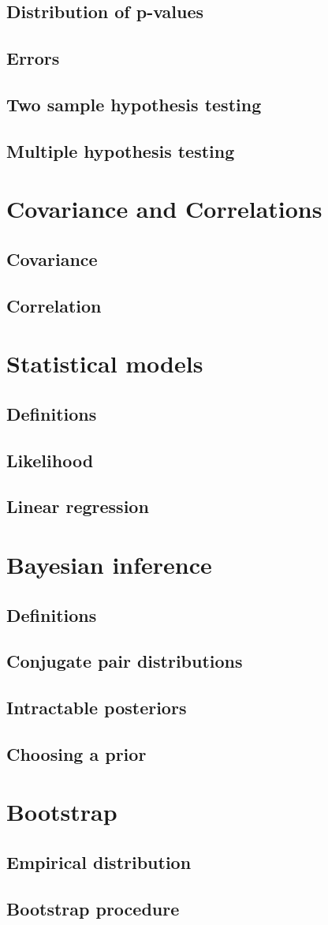 \documentclass[../Year1/Year1.tex]{subfiles}
\begin{document}
\subsection{Distribution of p-values}
\subsection{Errors}
\subsection{Two sample hypothesis testing}
\subsection{Multiple hypothesis testing}
\section{Covariance and Correlations}
\subsection{Covariance}
\subsection{Correlation}
\section{Statistical models}
\subsection{Definitions}
\subsection{Likelihood}
\subsection{Linear regression}
\section{Bayesian inference}
\subsection{Definitions}
\subsection{Conjugate pair distributions}
\subsection{Intractable posteriors}
\subsection{Choosing a prior}
\section{Bootstrap}
\subsection{Empirical distribution}
\subsection{Bootstrap procedure}
\end{document}
